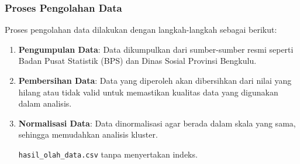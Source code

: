 \documentclass{article}
\begin{document}
\subsubsection{Proses Pengolahan Data}
Proses pengolahan data dilakukan dengan langkah-langkah sebagai berikut:

\begin{enumerate}
    \item \textbf{Pengumpulan Data}: Data dikumpulkan dari sumber-sumber resmi seperti Badan Pusat Statistik (BPS) dan Dinas Sosial Provinsi Bengkulu.
    
    \item \textbf{Pembersihan Data}: Data yang diperoleh akan dibersihkan dari nilai yang hilang atau tidak valid untuk memastikan kualitas data yang digunakan dalam analisis.
    
    \item \textbf{Normalisasi Data}: Data dinormalisasi agar berada dalam skala yang sama, sehingga memudahkan analisis kluster.
    
    \texttt{hasil\_olah\_data.csv} tanpa menyertakan indeks.
\end{enumerate}


\end{document}

